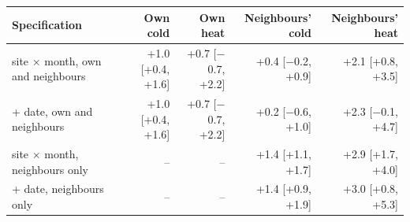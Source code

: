 \begin{tabular}{lrrrr}
\toprule
Specification & Own cold & Own heat & Neighbours' cold & Neighbours' heat \\
\midrule
site × month, own and neighbours & +1.0 [+0.4, +1.6] & +0.7 [$-$0.7, +2.2] & +0.4 [$-$0.2, +0.9] & +2.1 [+0.8, +3.5] \\
+ date, own and neighbours & +1.0 [+0.4, +1.6] & +0.7 [$-$0.7, +2.2] & +0.2 [$-$0.6, +1.0] & +2.3 [$-$0.1, +4.7] \\
\addlinespace[3pt]
site × month, neighbours only & -- & -- & +1.4 [+1.1, +1.7] & +2.9 [+1.7, +4.0] \\
+ date, neighbours only & -- & -- & +1.4 [+0.9, +1.9] & +3.0 [+0.8, +5.3] \\
\bottomrule
\end{tabular}
